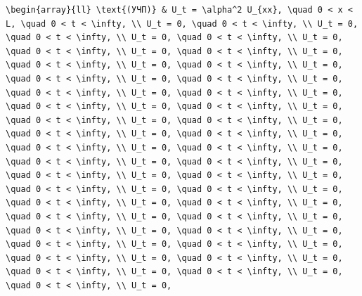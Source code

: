 \documentclass[
  ukrainian,
]{article}
\begin{document}
\begin{verbatim}
\begin{array}{ll} \text{(УЧП)} & U_t = \alpha^2 U_{xx}, \quad 0 < x < L, \quad 0 < t < \infty, \\ U_t = 0, \quad 0 < t < \infty, \\ U_t = 0, \quad 0 < t < \infty, \\ U_t = 0, \quad 0 < t < \infty, \\ U_t = 0, \quad 0 < t < \infty, \\ U_t = 0, \quad 0 < t < \infty, \\ U_t = 0, \quad 0 < t < \infty, \\ U_t = 0, \quad 0 < t < \infty, \\ U_t = 0, \quad 0 < t < \infty, \\ U_t = 0, \quad 0 < t < \infty, \\ U_t = 0, \quad 0 < t < \infty, \\ U_t = 0, \quad 0 < t < \infty, \\ U_t = 0, \quad 0 < t < \infty, \\ U_t = 0, \quad 0 < t < \infty, \\ U_t = 0, \quad 0 < t < \infty, \\ U_t = 0, \quad 0 < t < \infty, \\ U_t = 0, \quad 0 < t < \infty, \\ U_t = 0, \quad 0 < t < \infty, \\ U_t = 0, \quad 0 < t < \infty, \\ U_t = 0, \quad 0 < t < \infty, \\ U_t = 0, \quad 0 < t < \infty, \\ U_t = 0, \quad 0 < t < \infty, \\ U_t = 0, \quad 0 < t < \infty, \\ U_t = 0, \quad 0 < t < \infty, \\ U_t = 0, \quad 0 < t < \infty, \\ U_t = 0, \quad 0 < t < \infty, \\ U_t = 0, \quad 0 < t < \infty, \\ U_t = 0, \quad 0 < t < \infty, \\ U_t = 0, \quad 0 < t < \infty, \\ U_t = 0, \quad 0 < t < \infty, \\ U_t = 0, \quad 0 < t < \infty, \\ U_t = 0, \quad 0 < t < \infty, \\ U_t = 0, \quad 0 < t < \infty, \\ U_t = 0, \quad 0 < t < \infty, \\ U_t = 0, \quad 0 < t < \infty, \\ U_t = 0, \quad 0 < t < \infty, \\ U_t = 0, \quad 0 < t < \infty, \\ U_t = 0, \quad 0 < t < \infty, \\ U_t = 0, \quad 0 < t < \infty, \\ U_t = 0, 
\end{verbatim}
\end{document}

